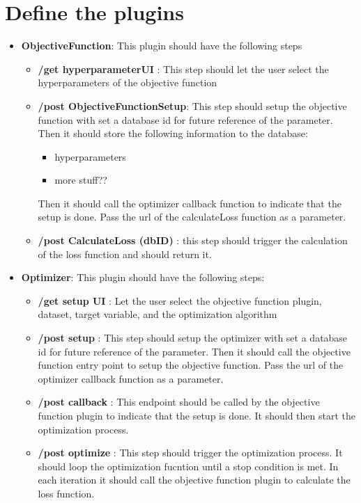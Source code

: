 \documentclass[
  a4paper,  %
  twoside,  %
  bibliography=totoc,
  headsepline,
  cleardoublepage=empty,
  parskip=half,
  draft=false
]{scrbook}
\begin{document}
\chapter{Define the plugins}
\begin{itemize}
  \item \textbf{ObjectiveFunction}: This plugin should have the following steps
  \begin{itemize}
    \item \textbf{ /get hyperparameterUI }: This step should let the user select the hyperparameters of the objective function
    \item \textbf{ /post ObjectiveFunctionSetup}: This step should setup the objective function with set a database id for future reference of the parameter. 
    Then it should store the following information to the database:
    \begin{itemize}
      \item hyperparameters
      \item more stuff?? %
    \end{itemize}
    Then it should call the optimizer callback function to indicate that the setup is done. Pass the url of the calculateLoss function as a parameter.
    \item \textbf{ /post CalculateLoss (dbID) }: this step should trigger the calculation of the loss function and should return it.
  \end{itemize}
  \item \textbf{Optimizer}: This plugin should have the following steps:
    \begin{itemize}
      \item \textbf{ /get setup UI }: Let the user select the objective function plugin, dataset, target variable, and the optimization algorithm
      \item \textbf{ /post setup }: This step should setup the optimizer with set a database id for future reference of the parameter. 
      Then it should call the objective function entry point to setup the objective function. Pass the url of the optimizer callback function as a parameter.
      \item \textbf{ /post callback }: This endpoint should be called by the objective function plugin to indicate that the setup is done.
      It should then start the optimization process.
      \item \textbf{ /post optimize }: This step should trigger the optimization process.
      It should loop the optimization fucntion until a stop condition is met.
      In each iteration it should call the objective function plugin to calculate the loss function.
    \end{itemize}
\end{itemize}
\end{document}
